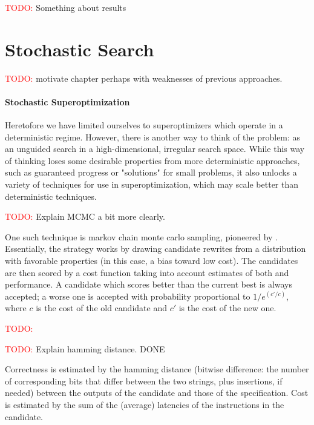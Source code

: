 \documentclass[12pt,twoside]{reedthesis}
\newcommand{\red}[1]{\textcolor{red}{#1}}
\begin{document}
\red{TODO:} Something about results


\chapter{Stochastic Search}
\red{TODO:} motivate chapter perhaps with weaknesses of previous approaches.

\subsubsection{Stochastic Superoptimization}
Heretofore we have limited ourselves to superoptimizers which operate in a deterministic regime.
However, there is another way to think of the problem: as an unguided search in a high-dimensional, irregular search space.
While this way of thinking loses some desirable properties from more deterministic approaches, such as guaranteed progress or "solutions" for small problems, it also unlocks a variety of techniques for use in superoptimization, which may scale better than deterministic techniques.

\red{TODO:} Explain MCMC a bit more clearly.

One such technique is markov chain monte carlo sampling, pioneered by \cite{schkufza2013stoke}. 
Essentially, the strategy works by drawing candidate rewrites from a distribution with favorable properties (in this case, a bias toward low cost).
The candidates are then scored by a cost function taking into account estimates of both and performance.
A candidate which scores better than the current best is always accepted; a worse one is accepted with probability proportional to $1/e^(c'/c)$, where $c$ is the cost of the old candidate and $c'$ is the cost of the new one.

\red{TODO:} 

\red{TODO:} Explain hamming distance. DONE

Correctness is estimated by the hamming distance (bitwise difference: the number of corresponding bits that differ between the two strings, plus insertions, if needed) between the outputs of the candidate and those of the specification.
Cost is estimated by the sum of the (average) latencies of the instructions in the candidate.
\end{document}
